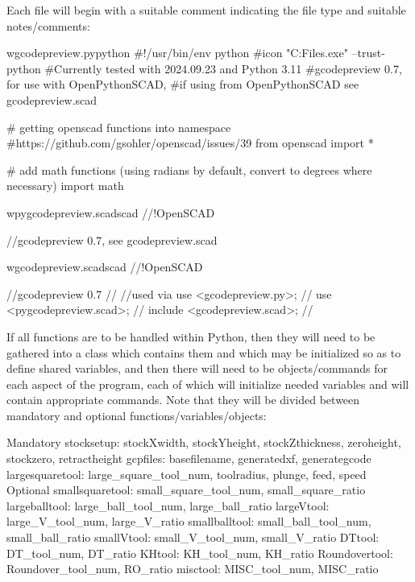 \documentclass{ltxdoc}
\begin{document}
Each file will begin with a suitable comment indicating the file type and suitable notes/comments:

\begin{writecode}{w}{gcodepreview.py}{python}
#!/usr/bin/env python
#icon "C:\Program Files\PythonSCAD\bin\openscad.exe"  --trust-python
#Currently tested with 2024.09.23 and Python 3.11
#gcodepreview 0.7, for use with OpenPythonSCAD, 
#if using from OpenPythonSCAD see gcodepreview.scad

# getting openscad functions into namespace
#https://github.com/gsohler/openscad/issues/39
from openscad import *

# add math functions (using radians by default, convert to degrees where necessary)
import math

\end{writecode}
\addtocounter{gcpy}{14}

\begin{writecode}{w}{pygcodepreview.scad}{scad}
//!OpenSCAD
 
//gcodepreview 0.7, see gcodepreview.scad

\end{writecode}
\addtocounter{pyscad}{4}

\begin{writecode}{w}{gcodepreview.scad}{scad}
//!OpenSCAD
 
//gcodepreview 0.7
//
//used via use <gcodepreview.py>;
//         use <pygcodepreview.scad>;
//         include <gcodepreview.scad>;
//

\end{writecode}
\addtocounter{gcpscad}{9}

If all functions are to be handled within Python, then they will need to be gathered into a class which contains them and which may be initialized so as to define shared variables, and then there will need to be objects/commands for each aspect of the program, each of which will initialize needed variables and will contain appropriate commands. Note that they will be divided between mandatory and optional functions/variables/objects:

\begin{outline}
\1 Mandatory
   \2 stocksetup:
      \3 stockXwidth, stockYheight, stockZthickness, zeroheight, stockzero, retract\-height
   \2 gcpfiles: 
      \3 basefilename, generatedxf, generategcode
   \2 largesquaretool: 
      \3 large\_square\_tool\_num, toolradius, plunge, feed, speed
\1 Optional
   \2 smallsquaretool: 
      \3small\_square\_tool\_num, small\_square\_ratio
   \2 largeballtool: 
      \3 large\_ball\_tool\_num, large\_ball\_ratio
   \2 largeVtool: 
      \3 large\_V\_tool\_num, large\_V\_ratio
   \2 smallballtool: 
      \3 small\_ball\_tool\_num, small\_ball\_ratio
   \2 smallVtool: 
      \3 small\_V\_tool\_num, small\_V\_ratio
   \2 DTtool: 
      \3 DT\_tool\_num, DT\_ratio
   \2 KHtool: 
      \3 KH\_tool\_num, KH\_ratio
   \2 Roundovertool: 
      \3 Roundover\_tool\_num, RO\_ratio
   \2 misctool: 
      \3 MISC\_tool\_num, MISC\_ratio
\end{outline}
\end{document}
